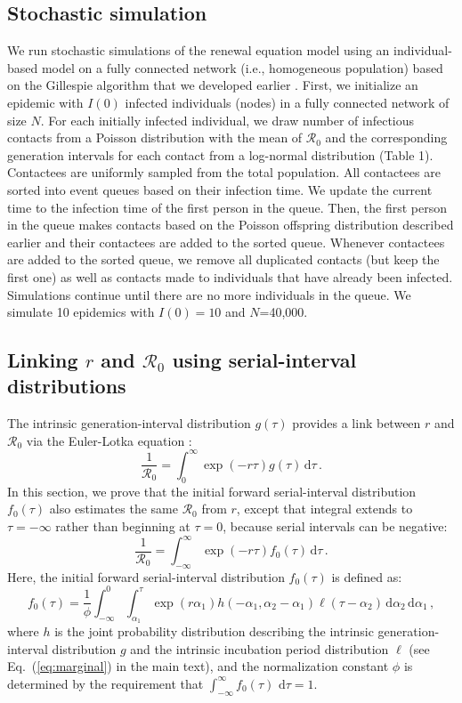 \documentclass[12pt]{article}
\newcommand{\eref}[1]{Eq.~(\ref{eq:#1})}
\newcommand{\Rx}[1]{\ensuremath{{\mathcal R}_{#1}}\xspace}
\newcommand{\Ro}{\Rx{0}}
\newcommand{\dd}[1]{\ensuremath{\, \mathrm{d}#1}}
\newcommand{\dtau}{\dd{\tau}}
\newcommand{\gdist}{g} %
\newcommand{\idist}{\ell} %
\begin{document}
\subsection{Stochastic simulation}

We run stochastic simulations of the renewal equation model using an individual-based model on a fully connected network (i.e., homogeneous population) based on the Gillespie algorithm that we developed earlier \citep{park2020inferring}.
First, we initialize an epidemic with $I(0)$ infected individuals (nodes) in a fully connected network of size $N$. 
For each initially infected individual, we draw number of infectious contacts from a Poisson distribution with the mean of \Ro and the corresponding generation intervals for each contact from a log-normal distribution (Table 1).
Contactees are uniformly sampled from the total population.
All contactees are sorted into event queues based on their infection time.
We update the current time to the infection time of the first person in the queue.
Then, the first person in the queue makes contacts based on the Poisson offspring distribution described earlier and their contactees are added to the sorted queue.
Whenever contactees are added to the sorted queue, we remove all duplicated contacts (but keep the first one) as well as contacts made to individuals that have already been infected.
Simulations continue until there are no more individuals in the queue.
We simulate 10 epidemics with $I(0)=10$ and $N$=40,000.

\subsection{Linking $r$ and \Ro using serial-interval distributions}

The intrinsic generation-interval distribution $\gdist(\tau)$ provides a link between $r$ and \Ro via the Euler-Lotka equation \citep{wallinga2007generation}:
\begin{equation}
\frac{1}{\Ro} = \int_0^\infty \exp(-r\tau) \gdist(\tau) \dtau\,.
\end{equation}
In this section, we prove that the initial forward serial-interval distribution $f_0(\tau)$ also estimates the same \Ro from $r$, except that integral extends to $\tau=-\infty$ rather than beginning at $\tau=0$, because serial intervals can be negative:
\begin{equation}
\frac{1}{\Ro} = \int_{-\infty}^\infty \exp(-r\tau) f_{0}(\tau) \dtau\,.
\label{eq:ptarget}
\end{equation}
Here, the initial forward serial-interval distribution $f_{0}(\tau)$ is defined as:
\begin{equation}
f_{0}(\tau) = \frac{1}{\phi} \int_{-\infty}^{0} \int_{\alpha_1}^{\tau} \exp(r \alpha_1) h(-\alpha_1, \alpha_2 - \alpha_1) \idist(\tau - \alpha_2) \, \mathrm{d}\alpha_2\,\mathrm{d}\alpha_1\,,
\label{eq:fdist}
\end{equation}
where $h$ is the joint probability distribution describing the
intrinsic generation-interval distribution $g$ and the intrinsic
incubation period distribution $\idist$ (see \eref{marginal} in the
main text), and the normalization constant $\phi$ is determined by the
requirement that $\int_{-\infty}^\infty f_{0}(\tau)\,\dtau=1$.
\end{document}
